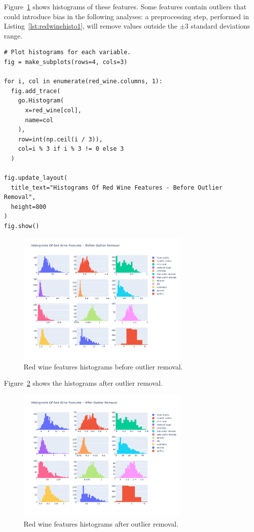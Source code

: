 \documentclass[12pt]{article}
\begin{document}
  Figure~\ref{fig:redwinehisto1} shows histograms of these features. Some
  features contain outliers that could introduce bias in the following
  analyses: a preprocessing step, performed in Listing~\ref{lst:redwinehisto1},
  will remove values outside the $\pm 3$ standard deviations range.

  \begin{lstlisting}[caption={Preprocessing step.}, captionpos=b,
    label={lst:redwinehisto1}]
# Plot histograms for each variable.
fig = make_subplots(rows=4, cols=3)

for i, col in enumerate(red_wine.columns, 1):
  fig.add_trace(
    go.Histogram(
      x=red_wine[col],
      name=col
    ), 
    row=int(np.ceil(i / 3)), 
    col=i % 3 if i % 3 != 0 else 3
  )

fig.update_layout(
  title_text="Histograms Of Red Wine Features - Before Outlier Removal",
  height=800
)
fig.show() 
  \end{lstlisting}

  \begin{figure}[!ht]
    \centering
    \includegraphics[width=0.75\textwidth]{figures/redwinehisto1}
    \caption{Red wine features histograms before outlier removal.}%
    \label{fig:redwinehisto1}
  \end{figure} 

  Figure~\ref{fig:redwinehisto2} shows the histograms after outlier removal.
  \begin{figure}[!ht]
    \centering
    \includegraphics[width=0.75\textwidth]{figures/redwinehisto2}
    \caption{Red wine features histograms after outlier removal.}%
    \label{fig:redwinehisto2}
  \end{figure} 
\end{document}
